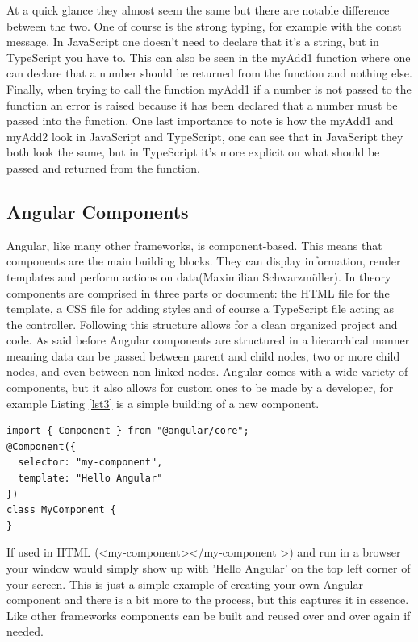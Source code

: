 \documentclass[11pt]{article}
\begin{document}
At a quick glance they almost seem the same but there are notable difference between the two. One of course is the strong typing, for example with the const message. 
In JavaScript one doesn't need to declare that it's a string, but in TypeScript you have to. This can also be seen in the myAdd1 function where one can declare that a 
number should be returned from the function and nothing else. Finally, when trying to call the function myAdd1 if a number is not passed to the function an error is 
raised because it has been declared that a number must be passed into the function. One last importance to note is how the myAdd1 and myAdd2 look in JavaScript and TypeScript, 
one can see that in JavaScript they both look the same, but in TypeScript it's more explicit on what should be passed and returned from the function.

\subsection{Angular Components}
Angular, like many other frameworks, is component-based. This means that components are the main building blocks. They can display information, render templates
and perform actions on data(Maximilian Schwarzmüller)\cite{ReactvsA7:online}. In theory components are comprised in three parts or document: the HTML file for the 
template, a CSS file for adding styles and of course a TypeScript file acting as the controller. Following this structure allows for a clean organized project and 
code. As said before Angular components are structured in a hierarchical manner meaning data can be passed between parent and child nodes, two or more child nodes,
and even between non linked nodes. Angular comes with a wide variety of components, but it also allows for custom ones to be made by a developer, for example 
Listing \ref{lst3} is a simple building of a new component.
\begin{lstlisting}[caption={Simple Angular component}, label={lst3}]
import { Component } from "@angular/core";
@Component({
  selector: "my-component",
  template: "Hello Angular"
})
class MyComponent {
}
\end{lstlisting}

If used in HTML (\textless my-component\textgreater \textless /my-component \textgreater) and run in a browser your window would simply show up with 'Hello Angular' on the top left corner of your screen. 
This is just a simple example of creating your own Angular component and there is a bit more to the process, but this captures it in essence. Like 
other frameworks components can be built and reused over and over again if needed.
\end{document}
